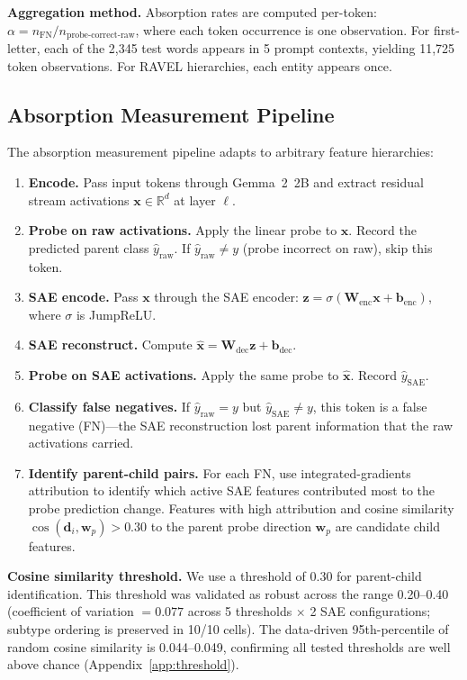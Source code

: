 \documentclass{article}
\begin{document}
\textbf{Aggregation method.} Absorption rates are computed per-token: $\alpha = n_{\text{FN}} / n_{\text{probe-correct-raw}}$, where each token occurrence is one observation. For first-letter, each of the 2,345 test words appears in 5 prompt contexts, yielding 11,725 token observations. For RAVEL hierarchies, each entity appears once.

\subsection{Absorption Measurement Pipeline}

The absorption measurement pipeline adapts \citet{chanin2024absorption} to arbitrary feature hierarchies:

\begin{enumerate}
\item \textbf{Encode.} Pass input tokens through Gemma~2~2B and extract residual stream activations $\mathbf{x} \in \mathbb{R}^d$ at layer $\ell$.
\item \textbf{Probe on raw activations.} Apply the linear probe to $\mathbf{x}$. Record the predicted parent class $\hat{y}_{\text{raw}}$. If $\hat{y}_{\text{raw}} \neq y$ (probe incorrect on raw), skip this token.
\item \textbf{SAE encode.} Pass $\mathbf{x}$ through the SAE encoder: $\mathbf{z} = \sigma(\mathbf{W}_{\text{enc}} \mathbf{x} + \mathbf{b}_{\text{enc}})$, where $\sigma$ is JumpReLU.
\item \textbf{SAE reconstruct.} Compute $\hat{\mathbf{x}} = \mathbf{W}_{\text{dec}} \mathbf{z} + \mathbf{b}_{\text{dec}}$.
\item \textbf{Probe on SAE activations.} Apply the same probe to $\hat{\mathbf{x}}$. Record $\hat{y}_{\text{SAE}}$.
\item \textbf{Classify false negatives.} If $\hat{y}_{\text{raw}} = y$ but $\hat{y}_{\text{SAE}} \neq y$, this token is a false negative (FN)---the SAE reconstruction lost parent information that the raw activations carried.
\item \textbf{Identify parent-child pairs.} For each FN, use integrated-gradients attribution to identify which active SAE features contributed most to the probe prediction change. Features with high attribution and cosine similarity $\cos(\mathbf{d}_i, \mathbf{w}_p) > 0.30$ to the parent probe direction $\mathbf{w}_p$ are candidate child features.
\end{enumerate}

\textbf{Cosine similarity threshold.} We use a threshold of 0.30 for parent-child identification. This threshold was validated as robust across the range 0.20--0.40 (coefficient of variation $= 0.077$ across 5 thresholds $\times$ 2 SAE configurations; subtype ordering is preserved in 10/10 cells). The data-driven 95th-percentile of random cosine similarity is 0.044--0.049, confirming all tested thresholds are well above chance (Appendix~\ref{app:threshold}).
\end{document}
